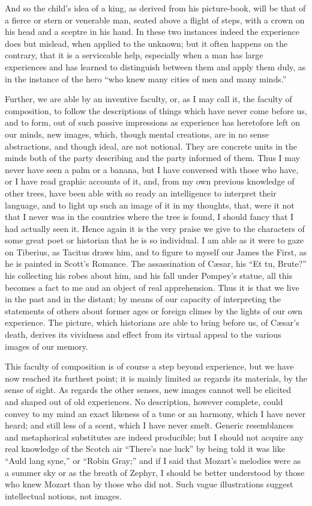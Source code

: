 And so the child's idea of a king, as derived from his
picture-book, will be that of a fierce or stern or venerable man,
seated above a flight of steps, with a crown on his head and a sceptre
in his hand. In these two instances indeed the experience does but
mislead, when applied to the unknown; but it often happens on the
contrary, that it is a serviceable help, especially when a man has
large experiences and has learned to distinguish between them and
apply them duly, as in the instance of the hero ``who knew many
cities of men and many minds.''

Further, we are able by an inventive faculty, or, as I may call it,
the faculty of composition, to follow the descriptions of things which
have never come before us, and to form, out of such passive
impressions as experience has heretofore left on our minds, new
images, which, though mental creations, are in no sense abstractions,
and though ideal, are not notional. They are concrete units in the
minds both of the party describing and the party informed of them.
Thus I may never have seen a palm or a banana, but I have conversed
with those who have, or I have read graphic accounts of it, and, from
my own previous knowledge of other trees, have been able with so ready
an intelligence to interpret their language, and to light up such an
image of it in my thoughts, that, were it not that I never was in the
countries where the tree is found, I should fancy that I had actually
seen it. Hence again it is the very praise we give to the characters
of some great poet or historian that he is so individual. I am able as
it were to gaze on Tiberius, as Tacitus draws him, and to figure to
myself our James the First, as he is painted in Scott's Romance. The
assassination of Cæsar, his ``Et tu, Brute?'' his collecting
his robes about him, and his fall under Pompey's statue, all this
becomes a fact to me and an object of real apprehension. Thus it
is that we live in the past and in the distant; by means of our
capacity of interpreting the statements of others about former ages or
foreign climes by the lights of our own experience. The picture, which
historians are able to bring before us, of Cæsar's death, derives its
vividness and effect from its virtual appeal to the various images of
our memory.

This faculty of composition is of course a step beyond experience,
but we have now reached its furthest point; it is mainly limited as
regards its materials, by the sense of sight. As regards the other
senses, new images cannot well be elicited and shaped out of old
experiences. No description, however complete, could convey to my mind
an exact likeness of a tune or an harmony, which I have never heard;
and still less of a scent, which I have never smelt. Generic
resemblances and metaphorical substitutes are indeed producible; but I
should not acquire any real knowledge of the Scotch air ``There's
nae luck'' by being told it was like ``Auld lang syne,''
or ``Robin Gray;'' and if I said that Mozart's melodies were
as a summer sky or as the breath of Zephyr, I should be better
understood by those who knew Mozart than by those who did not. Such
vague illustrations suggest intellectual notions, not images.


